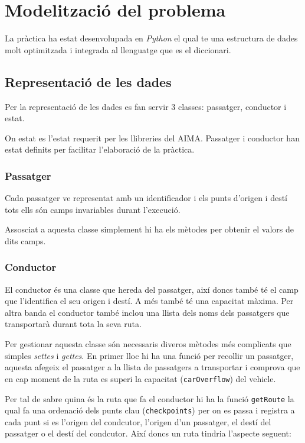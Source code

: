 \section{Modelització del problema}
La pràctica ha estat desenvolupada en \emph{Python} el qual te una estructura de dades molt optimitzada
i integrada al llenguatge que es el diccionari.

\subsection{Representació de les dades}
Per la representació de les dades es fan servir 3 classes: passatger, conductor i estat.

On estat es l'estat requerit per les llibreries del AIMA. Passatger i conductor han estat
definits per facilitar l'elaboració de la pràctica.

\subsubsection{Passatger}
Cada passatger ve representat amb un identificador i els punts d'origen i destí tots ells són
camps invariables durant l'execució.

Assosciat a aquesta classe simplement hi ha els mètodes per obtenir el valors de dits camps.

\subsubsection{Conductor}
El conductor és una classe que hereda del passatger, així doncs també té el camp que l'identifica
el seu origen i destí. A més també té una capacitat màxima.
Per altra banda el conductor també inclou una llista dels noms dels passatgers que transportarà
durant tota la seva ruta.

Per gestionar aquesta classe són necessaris diveros mètodes més complicats que simples \emph{settes} i \emph{gettes}.
En primer lloc hi ha una funció  per recollir un passatger, aquesta afegeix el passatger
a la llista de passatgers a transportar i comprova que en cap moment de la ruta es superi la capacitat
(\texttt{carOverflow}) del vehicle.

Per tal de sabre quina és la ruta que fa el conductor hi ha la funció \texttt{getRoute} la qual
fa una ordenació dels punts clau (\texttt{checkpoints}) per on es passa i registra a cada punt si es
l'origen del condcutor, l'origen d'un passatger, el destí del passatger o el destí del condcutor. Així
doncs un ruta tindria l'aspecte seguent: 


